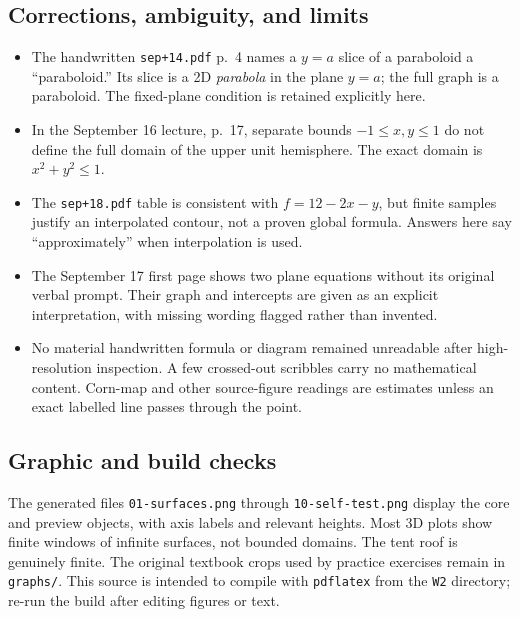 \subsection{Corrections, ambiguity, and limits}
\begin{itemize}[leftmargin=*]
\item The handwritten \texttt{sep+14.pdf} p.~4 names a $y=a$ slice of a paraboloid a ``paraboloid.'' Its slice is a 2D \emph{parabola} in the plane $y=a$; the full graph is a paraboloid. The fixed-plane condition is retained explicitly here.
\item In the September 16 lecture, p.~17, separate bounds $-1\leq x,y\leq1$ do not define the full domain of the upper unit hemisphere. The exact domain is $x^2+y^2\leq1$.
\item The \texttt{sep+18.pdf} table is consistent with $f=12-2x-y$, but finite samples justify an interpolated contour, not a proven global formula. Answers here say ``approximately'' when interpolation is used.
\item The September 17 first page shows two plane equations without its original verbal prompt. Their graph and intercepts are given as an explicit interpretation, with missing wording flagged rather than invented.
\item No material handwritten formula or diagram remained unreadable after high-resolution inspection. A few crossed-out scribbles carry no mathematical content. Corn-map and other source-figure readings are estimates unless an exact labelled line passes through the point.
\end{itemize}
\subsection{Graphic and build checks}
The generated files \texttt{01-surfaces.png} through \texttt{10-self-test.png} display the core and preview objects, with axis labels and relevant heights. Most 3D plots show finite windows of infinite surfaces, not bounded domains. The tent roof is genuinely finite. The original textbook crops used by practice exercises remain in \texttt{graphs/}. This source is intended to compile with \texttt{pdflatex} from the \texttt{W2} directory; re-run the build after editing figures or text.

